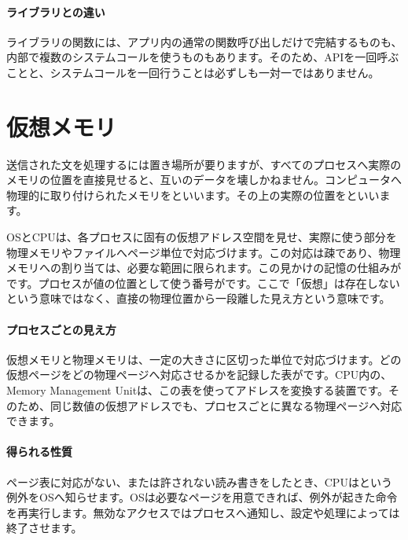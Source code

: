 \paragraph{ライブラリとの違い}
        ライブラリの関数には、アプリ内の通常の関数呼び出しだけで完結するものも、内部で複数のシステムコールを使うものもあります。そのため、APIを一回呼ぶことと、システムコールを一回行うことは必ずしも一対一ではありません。

\par
\endgroup
\par
\endgroup


\section{仮想メモリ}
\label{sec:03-runtime-data-04}

送信された文を処理するには置き場所が要りますが、すべてのプロセスへ実際のメモリの位置を直接見せると、互いのデータを壊しかねません。コンピュータへ物理的に取り付けられたメモリをといいます。その上の実際の位置をといいます。

OSとCPUは、各プロセスに固有の仮想アドレス空間を見せ、実際に使う部分を物理メモリやファイルへページ単位で対応づけます。この対応は疎であり、物理メモリへの割り当ては、必要な範囲に限られます。この見かけの記憶の仕組みがです。プロセスが値の位置として使う番号がです。ここで「仮想」は存在しないという意味ではなく、直接の物理位置から一段離した見え方という意味です。

\begingroup
\begingroup
      \centering
\par
\endgroup
\medskip
\begingroup
\paragraph{プロセスごとの見え方}
        仮想メモリと物理メモリは、一定の大きさに区切った単位で対応づけます。どの仮想ページをどの物理ページへ対応させるかを記録した表がです。CPU内の、Memory Management Unitは、この表を使ってアドレスを変換する装置です。そのため、同じ数値の仮想アドレスでも、プロセスごとに異なる物理ページへ対応できます。

\paragraph{得られる性質}
        ページ表に対応がない、または許されない読み書きをしたとき、CPUはという例外をOSへ知らせます。OSは必要なページを用意できれば、例外が起きた命令を再実行します。無効なアクセスではプロセスへ通知し、設定や処理によっては終了させます。

